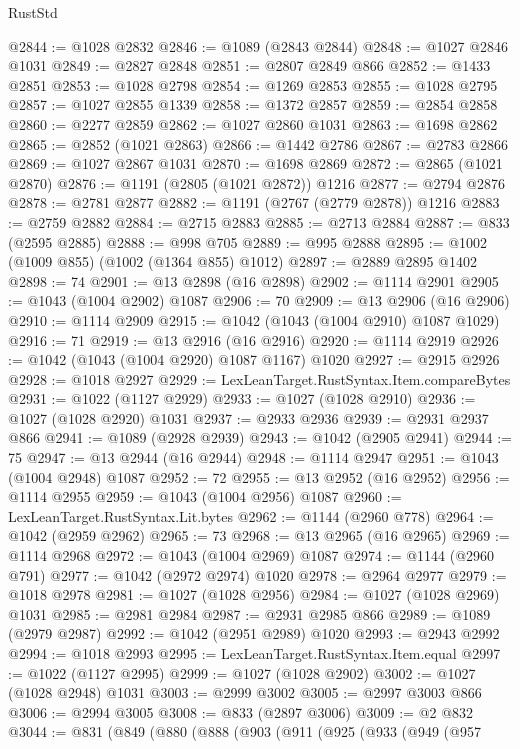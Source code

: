 \begin{lexlean}{RustStd}
\begin{coremodule}
@2844 := @1028 @2832
@2846 := @1089 (@2843 @2844)
@2848 := @1027 @2846 @1031
@2849 := @2827 @2848
@2851 := @2807 @2849 @866
@2852 := @1433 @2851
@2853 := @1028 @2798
@2854 := @1269 @2853
@2855 := @1028 @2795
@2857 := @1027 @2855 @1339
@2858 := @1372 @2857
@2859 := @2854 @2858
@2860 := @2277 @2859
@2862 := @1027 @2860 @1031
@2863 := @1698 @2862
@2865 := @2852 (@1021 @2863)
@2866 := @1442 @2786
@2867 := @2783 @2866
@2869 := @1027 @2867 @1031
@2870 := @1698 @2869
@2872 := @2865 (@1021 @2870)
@2876 := @1191 (@2805 (@1021 @2872)) @1216
@2877 := @2794 @2876
@2878 := @2781 @2877
@2882 := @1191 (@2767 (@2779 @2878)) @1216
@2883 := @2759 @2882
@2884 := @2715 @2883
@2885 := @2713 @2884
@2887 := @833 (@2595 @2885)
@2888 := @998 @705
@2889 := @995 @2888
@2895 := @1002 (@1009 @855) (@1002 (@1364 @855) @1012)
@2897 := @2889 @2895 @1402
@2898 := 74
@2901 := @13 @2898 (@16 @2898)
@2902 := @1114 @2901
@2905 := @1043 (@1004 @2902) @1087
@2906 := 70
@2909 := @13 @2906 (@16 @2906)
@2910 := @1114 @2909
@2915 := @1042 (@1043 (@1004 @2910) @1087 @1029)
@2916 := 71
@2919 := @13 @2916 (@16 @2916)
@2920 := @1114 @2919
@2926 := @1042 (@1043 (@1004 @2920) @1087 @1167) @1020
@2927 := @2915 @2926
@2928 := @1018 @2927
@2929 := LexLeanTarget.RustSyntax.Item.compareBytes
@2931 := @1022 (@1127 @2929)
@2933 := @1027 (@1028 @2910)
@2936 := @1027 (@1028 @2920) @1031
@2937 := @2933 @2936
@2939 := @2931 @2937 @866
@2941 := @1089 (@2928 @2939)
@2943 := @1042 (@2905 @2941)
@2944 := 75
@2947 := @13 @2944 (@16 @2944)
@2948 := @1114 @2947
@2951 := @1043 (@1004 @2948) @1087
@2952 := 72
@2955 := @13 @2952 (@16 @2952)
@2956 := @1114 @2955
@2959 := @1043 (@1004 @2956) @1087
@2960 := LexLeanTarget.RustSyntax.Lit.bytes
@2962 := @1144 (@2960 @778)
@2964 := @1042 (@2959 @2962)
@2965 := 73
@2968 := @13 @2965 (@16 @2965)
@2969 := @1114 @2968
@2972 := @1043 (@1004 @2969) @1087
@2974 := @1144 (@2960 @791)
@2977 := @1042 (@2972 @2974) @1020
@2978 := @2964 @2977
@2979 := @1018 @2978
@2981 := @1027 (@1028 @2956)
@2984 := @1027 (@1028 @2969) @1031
@2985 := @2981 @2984
@2987 := @2931 @2985 @866
@2989 := @1089 (@2979 @2987)
@2992 := @1042 (@2951 @2989) @1020
@2993 := @2943 @2992
@2994 := @1018 @2993
@2995 := LexLeanTarget.RustSyntax.Item.equal
@2997 := @1022 (@1127 @2995)
@2999 := @1027 (@1028 @2902)
@3002 := @1027 (@1028 @2948) @1031
@3003 := @2999 @3002
@3005 := @2997 @3003 @866
@3006 := @2994 @3005
@3008 := @833 (@2897 @3006)
@3009 := @2 @832
@3044 := @831
    (@849
      (@880
        (@888
          (@903
            (@911
              (@925
                (@933
                  (@949
                    (@957

\end{coremodule}
\end{lexlean}
